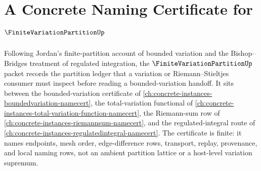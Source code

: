 \chapter{A Concrete Naming Certificate for $\FiniteVariationPartitionUp$}
\label{ch:concrete-instances-finite-variation-partition-namecert}

Following Jordan's finite-partition account of bounded variation and the Bishop--Bridges treatment of regulated integration, the $\FiniteVariationPartitionUp$ packet records the partition ledger that a variation or Riemann--Stieltjes consumer must inspect before reading a bounded-variation handoff. It sits between the bounded-variation certificate of \autoref{ch:concrete-instances-boundedvariation-namecert}, the total-variation functional of \autoref{ch:concrete-instances-total-variation-function-namecert}, the Riemann-sum row of \autoref{ch:concrete-instances-riemannsum-namecert}, and the regulated-integral route of \autoref{ch:concrete-instances-regulatedintegral-namecert}. The certificate is finite: it names endpoints, mesh order, edge-difference rows, transport, replay, provenance, and local naming rows, not an ambient partition lattice or a host-level variation supremum.



